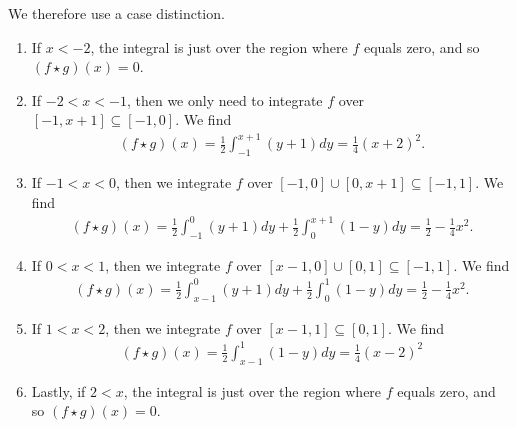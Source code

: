\documentclass[11pt]{article}
\begin{document}
\begin{solution}
\begin{itemize}
        We therefore use a case distinction. 
        \begin{enumerate}
            \item If $x < -2$, the integral is just over the region where $f$ equals zero,
            and so $( f \star g )(x) = 0$.
            \item If $-2 < x < -1$, then we only need to integrate $f$ over $[-1,x+1] \subseteq [-1,0]$. We find 
            \begin{align*}
                (f \star g)(x) = \frac 1 2 \int_{-1}^{x + 1} (y + 1) dy = \frac 1 4 (x + 2)^2.
            \end{align*}
            \item If $-1 < x < 0$, then we integrate $f$ over $[-1,0] \cup [0,x+1] \subseteq [-1,1]$. We find 
            \begin{align*}
                (f \star g)(x) = \frac 1 2\int_{-1}^{0} (y + 1) dy + \frac 1 2\int_{0}^{x + 1} (1 - y) dy =  \frac 1 2 - \frac 1 4 x^2.
            \end{align*}
            \item If $0 < x < 1$, then we integrate $f$ over $[x-1,0] \cup [0,1] \subseteq [-1,1]$. We find 
            \begin{align*}
                (f \star g)(x) = \frac 1 2 \int_{x - 1}^{0} (y + 1) dy + \frac 1 2 \int_{0}^{1} (1 - y) dy = \frac 1 2 - \frac 1 4 x^2.
            \end{align*}
            \item If $1 < x < 2$, then we integrate $f$ over $[x-1,1] \subseteq [0,1]$. We find 
            \begin{align*}
                (f \star g)(x) = \frac 1 2 \int_{x - 1}^{1} (1 - y) dy = \frac 1 4 ( x - 2)^2
            \end{align*}
            \item Lastly, if $2 < x$, the integral is just over the region where $f$ equals zero, 
            and so $( f \star g )(x) = 0$.
        \end{enumerate}



\end{itemize}
\end{solution}
\end{document}

